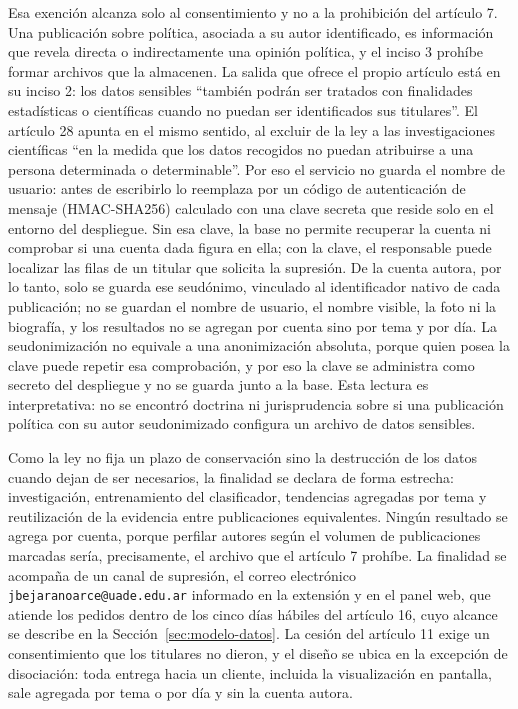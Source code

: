 Esa exención alcanza solo al consentimiento y no a la prohibición del artículo 7. Una publicación sobre política, asociada a su autor identificado, es información que revela directa o indirectamente una opinión política, y el inciso 3 prohíbe formar archivos que la almacenen. La salida que ofrece el propio artículo está en su inciso 2: los datos sensibles \enquote{también podrán ser tratados con finalidades estadísticas o científicas cuando no puedan ser identificados sus titulares}. El artículo 28 apunta en el mismo sentido, al excluir de la ley a las investigaciones científicas \enquote{en la medida que los datos recogidos no puedan atribuirse a una persona determinada o determinable}. Por eso el servicio no guarda el nombre de usuario: antes de escribirlo lo reemplaza por un código de autenticación de mensaje (HMAC-SHA256) calculado con una clave secreta que reside solo en el entorno del despliegue. Sin esa clave, la base no permite recuperar la cuenta ni comprobar si una cuenta dada figura en ella; con la clave, el responsable puede localizar las filas de un titular que solicita la supresión. De la cuenta autora, por lo tanto, solo se guarda ese seudónimo, vinculado al identificador nativo de cada publicación; no se guardan el nombre de usuario, el nombre visible, la foto ni la biografía, y los resultados no se agregan por cuenta sino por tema y por día. La seudonimización no equivale a una anonimización absoluta, porque quien posea la clave puede repetir esa comprobación, y por eso la clave se administra como secreto del despliegue y no se guarda junto a la base. Esta lectura es interpretativa: no se encontró doctrina ni jurisprudencia sobre si una publicación política con su autor seudonimizado configura un archivo de datos sensibles.

Como la ley no fija un plazo de conservación sino la destrucción de los datos cuando dejan de ser necesarios, la finalidad se declara de forma estrecha: investigación, entrenamiento del clasificador, tendencias agregadas por tema y reutilización de la evidencia entre publicaciones equivalentes. Ningún resultado se agrega por cuenta, porque perfilar autores según el volumen de publicaciones marcadas sería, precisamente, el archivo que el artículo 7 prohíbe. La finalidad se acompaña de un canal de supresión, el correo electrónico \texttt{jbejaranoarce@uade.edu.ar} informado en la extensión y en el panel web, que atiende los pedidos dentro de los cinco días hábiles del artículo 16, cuyo alcance se describe en la Sección~\ref{sec:modelo-datos}. La cesión del artículo 11 exige un consentimiento que los titulares no dieron, y el diseño se ubica en la excepción de disociación: toda entrega hacia un cliente, incluida la visualización en pantalla, sale agregada por tema o por día y sin la cuenta autora.

